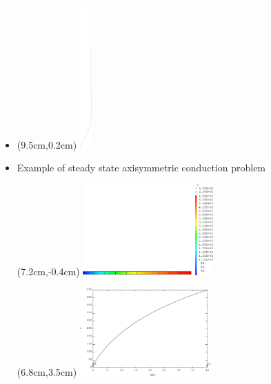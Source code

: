 \begin{frame}{}
  \begin{itemize}
    \item {}
    \begin{textblock*}{6cm}(9.5cm,0.2cm)
      \includegraphics[height=5.5cm]{images/coque_2d_axi}
    \end{textblock*}
    
  \end{itemize}
  \vspace{1cm}
\end{frame}

\begin{frame}{}
  \begin{itemize}
    \item {}
             {Example of steady state axisymmetric conduction problem}
    \begin{textblock*}{6cm}(7.2cm,-0.4cm)
      \includegraphics[width=5cm]{images/thermique_2d_axi.1}
    \end{textblock*}
    \begin{textblock*}{6cm}(6.8cm,3.5cm)
      \includegraphics[width=5cm]{images/thermique_2d_axi.2}
    \end{textblock*}
    
  \end{itemize}
  \vspace{1cm}
\end{frame}

